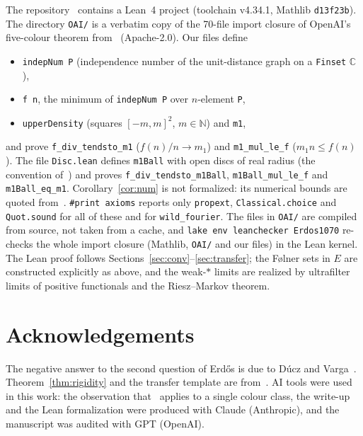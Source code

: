 \documentclass[11pt]{amsart}
\theoremstyle{definition}
\theoremstyle{remark}
\newcommand{\C}{\mathbb{C}}
\newcommand{\N}{\mathbb{N}}
\begin{document}
The repository~\cite{repo} contains a Lean~4 project (toolchain v4.34.1, Mathlib \texttt{d13f23b}). The directory \texttt{OAI/} is a verbatim copy of the 70-file import closure of OpenAI's five-colour theorem from~\cite{OAIrepo} (Apache-2.0). Our files define
\begin{itemize}
\item \texttt{indepNum P} (independence number of the unit-distance graph on a \texttt{Finset} $\C$),
\item \texttt{f n}, the minimum of \texttt{indepNum P} over $n$-element \texttt{P},
\item \texttt{upperDensity} (squares $[-m,m]^2$, $m\in\N$) and \texttt{m1},
\end{itemize}
and prove \texttt{f\_div\_tendsto\_m1} ($f(n)/n\to m_1$) and \texttt{m1\_mul\_le\_f} ($m_1n\le f(n)$). The file \texttt{Disc.lean} defines \texttt{m1Ball} with open discs of real radius (the convention of~\cite{EP}) and proves \texttt{f\_div\_tendsto\_m1Ball}, \texttt{m1Ball\_mul\_le\_f} and \texttt{m1Ball\_eq\_m1}. Corollary~\ref{cor:num} is not formalized: its numerical bounds are quoted from~\cite{Croft,ACMVZ}. \texttt{\#print axioms} reports only \texttt{propext}, \texttt{Classical.choice} and \texttt{Quot.sound} for all of these and for \texttt{wild\_fourier}. The files in \texttt{OAI/} are compiled from source, not taken from a cache, and \texttt{lake env leanchecker Erdos1070} re-checks the whole import closure (Mathlib, \texttt{OAI/} and our files) in the Lean kernel. The Lean proof follows Sections~\ref{sec:conv}--\ref{sec:transfer}; the Følner sets in $E$ are constructed explicitly as above, and the weak-$*$ limits are realized by ultrafilter limits of positive functionals and the Riesz--Markov theorem.

\section*{Acknowledgements}
The negative answer to the second question of Erd\H{o}s is due to D\'ucz and Varga~\cite{DV}. Theorem~\ref{thm:rigidity} and the transfer template are from~\cite{OAI}. AI tools were used in this work: the observation that~\cite[Section~4]{OAI} applies to a single colour class, the write-up and the Lean formalization were produced with Claude (Anthropic), and the manuscript was audited with GPT (OpenAI).
\end{document}
